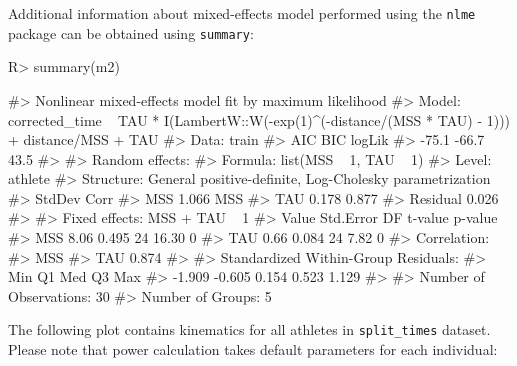 \documentclass[
]{jss}
\begin{document}
Additional information about mixed-effects model performed using the \texttt{nlme} package \citep{R-nlme} can be obtained using \texttt{summary}:

\begin{CodeChunk}
\begin{CodeInput}
R> summary(m2)
\end{CodeInput}
\begin{CodeOutput}
#> Nonlinear mixed-effects model fit by maximum likelihood
#>   Model: corrected_time ~ TAU * I(LambertW::W(-exp(1)^(-distance/(MSS *      TAU) - 1))) + distance/MSS + TAU 
#>  Data: train 
#>     AIC   BIC logLik
#>   -75.1 -66.7   43.5
#> 
#> Random effects:
#>  Formula: list(MSS ~ 1, TAU ~ 1)
#>  Level: athlete
#>  Structure: General positive-definite, Log-Cholesky parametrization
#>          StdDev Corr 
#> MSS      1.066  MSS  
#> TAU      0.178  0.877
#> Residual 0.026       
#> 
#> Fixed effects: MSS + TAU ~ 1 
#>     Value Std.Error DF t-value p-value
#> MSS  8.06     0.495 24   16.30       0
#> TAU  0.66     0.084 24    7.82       0
#>  Correlation: 
#>     MSS  
#> TAU 0.874
#> 
#> Standardized Within-Group Residuals:
#>    Min     Q1    Med     Q3    Max 
#> -1.909 -0.605  0.154  0.523  1.129 
#> 
#> Number of Observations: 30
#> Number of Groups: 5
\end{CodeOutput}
\end{CodeChunk}

The following plot contains kinematics for all athletes in \texttt{split\_times} dataset. Please note that power calculation takes default parameters for each individual:
\end{document}
